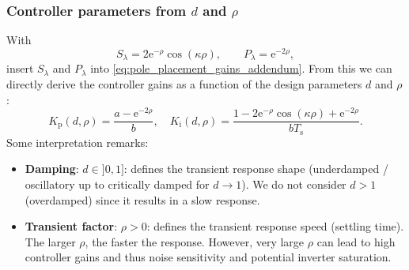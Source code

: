 \begin{frame}
    \frametitle{Controller parameters from $d$ and $\rho$}
    With
    \begin{equation}
        S_\lambda=2\mathrm{e}^{-\rho}\cos(\kappa\rho),
        \qquad
        P_\lambda=\mathrm{e}^{-2\rho},
    \end{equation}
    insert $S_\lambda$ and $P_\lambda$ into \eqref{eq:pole_placement_gains_addendum}. \pause From this we can directly derive the controller gains as a function of the design parameters $d$ and $\rho$:
    \begin{equation}
        K_\mathrm{p}(d,\rho)=\frac{a-\mathrm{e}^{-2\rho}}{b}, \quad K_\mathrm{i}(d,\rho)=\frac{1-2\mathrm{e}^{-\rho}\cos(\kappa\rho)+\mathrm{e}^{-2\rho}}{bT_\mathrm{s}}.
    \end{equation}\pause%
    Some interpretation remarks:
    \begin{itemize}
        \item \textbf{Damping}: $d\in]0,1]$: defines the transient response shape (underdamped / oscillatory up to critically damped for $d\rightarrow 1$). We do not consider $d>1$ (overdamped) since it results in a slow response.\pause%
        \item \textbf{Transient factor}: $\rho>0$: defines the transient response speed (settling time). The larger $\rho$, the faster the response. However, very large $\rho$ can lead to high controller gains and thus noise sensitivity and potential inverter saturation.
    \end{itemize}
\end{frame}

